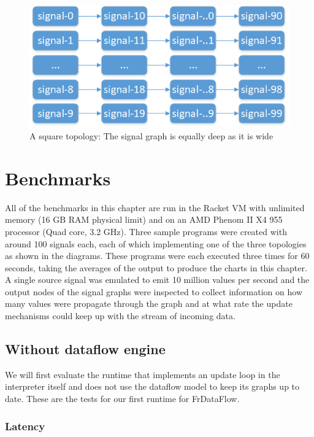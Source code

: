 \begin{figure}[h]
	\centerline{\includegraphics[scale=0.7]{images/Evaluation-Topologies-Square.png}}
	\caption{A square topology: The signal graph is equally deep as it is wide}
	\label{fig:evaluation-topologies-square}
\end{figure}

\section{Benchmarks}

All of the benchmarks in this chapter are run in the Racket VM with unlimited memory (16 GB RAM physical limit) and on an AMD Phenom II X4 955 processor (Quad core, 3.2 GHz). Three sample programs were created with around 100 signals each, each of which implementing one of the three topologies as shown in the diagrams. These programs were each executed three times for 60 seconds, taking the averages of the output to produce the charts in this chapter.
A single source signal was emulated to emit 10 million values per second and the output nodes of the signal graphs were inspected to collect information on how many values were propagate through the graph and at what rate the update mechanisms could keep up with the stream of incoming data. 

\newpage
\subsection{Without dataflow engine}

We will first evaluate the runtime that implements an update loop in the interpreter itself and does not use the dataflow model to keep its graphs up to date. These are the tests for our first runtime for FrDataFlow. 

\subsubsection{Latency}

